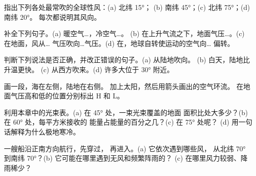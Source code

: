 \begin{exercise}[$\star$]\label{exo:g8:winds-global-circulation:1}
指出下列各处最常吹的全球性风：(a) 北纬 \ang{15}；
(b) 南纬 \ang{45}；(c) 北纬 \ang{75}；(d) 南纬 \ang{20}。
每次都说明其风向。
\end{exercise}

\begin{exercise}[$\star$]\label{exo:g8:winds-global-circulation:2}
补全下列句子。(a) 暖空气\dots{}，冷空气\dots{}。
(b) 在上升气流之下，地面气压\dots{}。(c) 在地面，风从\dots{}
气压吹向\dots{}气压。(d) 在，地球自转使运动的空气向\dots{}
偏转。
\end{exercise}

\begin{exercise}[$\star$]\label{exo:g8:winds-global-circulation:3}
判断下列说法是否正确，并改正错误的句子。(a) 从陆地吹向。
(b) 白天，陆地比升温更快。
(c) 从西方吹来。(d) 许多大位于
 \ang{30} 附近。
\end{exercise}

\begin{exercise}[$\star$]\label{exo:g8:winds-global-circulation:4}
画一段，海在左侧，陆地在右侧。
加上太阳，然后用箭头画出的空气环流。
在地面气压高和低的位置分别标出 H 和 L。
\end{exercise}

\begin{exercise}[$\star\star$]\label{exo:g8:winds-global-circulation:5}
利用本章中的光束表。(a) 在 \ang{45} 处，一束光束覆盖的地面
面积比处大多少？(b) 在 \ang{60} 处，每平方米接收的
能量占能量的百分之几？(c) 在 \ang{75} 处呢？
(d) 用一句话解释为什么极地寒冷。
\end{exercise}

\begin{exercise}[$\star\star$]\label{exo:g8:winds-global-circulation:6}
一艘船沿正南方向航行，先穿过，
再进入。(a) 它依次遇到哪些风，
从北纬 \ang{70} 到南纬 \ang{70}？(b) 它可能在哪里遇到无风和频繁阵雨的？
(c) 在哪里风力较弱、降雨稀少？
\end{exercise}

